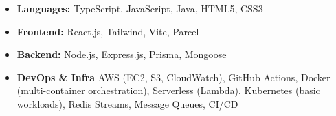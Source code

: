 \documentclass[11pt,letterpaper]{article}
\begin{document}
\vspace{0.5em}
\begin{itemize}[leftmargin=*,nosep]
  \item \textbf{Languages:}  TypeScript, JavaScript, Java, HTML5, CSS3
  \item \textbf{Frontend:} React.js, Tailwind, Vite, Parcel
  \item \textbf{Backend:} Node.js, Express.js, Prisma, Mongoose
  \item \textbf{DevOps & Infra} AWS (EC2, S3, CloudWatch), GitHub Actions, Docker (multi-container orchestration), Serverless (Lambda), Kubernetes (basic workloads), Redis Streams, Message Queues, CI/CD
\end{itemize}
\end{document}
